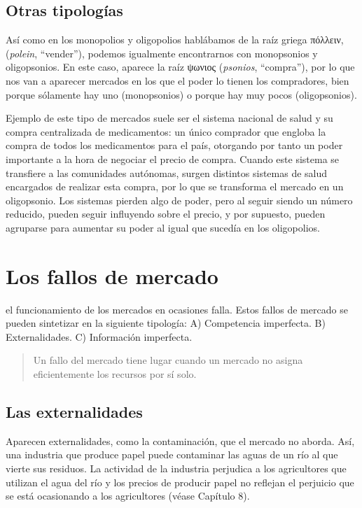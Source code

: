 \documentclass[
]{book}
\begin{document}
\hypertarget{otras-tipologuxedas}{%
\section{Otras tipologías}\label{otras-tipologuxedas}}

Así como en los monopolios y oligopolios hablábamos de la raíz griega πόλλειν, (\emph{polein}, ``vender''), podemos igualmente encontrarnos con monopsonios y oligopsonios. En este caso, aparece la raíz ψωνιος (\emph{psonios}, ``compra''), por lo que nos van a aparecer mercados en los que el poder lo tienen los compradores, bien porque sólamente hay uno (monopsonios) o porque hay muy pocos (oligopsonios).

Ejemplo de este tipo de mercados suele ser el sistema nacional de salud y su compra centralizada de medicamentos: un único comprador que engloba la compra de todos los medicamentos para el país, otorgando por tanto un poder importante a la hora de negociar el precio de compra. Cuando este sistema se transfiere a las comunidades autónomas, surgen distintos sistemas de salud encargados de realizar esta compra, por lo que se transforma el mercado en un oligopsonio. Los sistemas pierden algo de poder, pero al seguir siendo un número reducido, pueden seguir influyendo sobre el precio, y por supuesto, pueden agruparse para aumentar su poder al igual que sucedía en los oligopolios.

\hypertarget{los-fallos-de-mercado}{%
\chapter{Los fallos de mercado}\label{los-fallos-de-mercado}}

el funcionamiento de los mercados en ocasiones falla. Estos fallos de mercado se pueden sintetizar en la siguiente tipología:
A) Competencia imperfecta.
B) Externalidades.
C) Información imperfecta.

\begin{quote}
Un fallo del mercado tiene lugar cuando un mercado no asigna eficientemente los recursos por sí solo.
\end{quote}

\hypertarget{las-externalidades}{%
\section{Las externalidades}\label{las-externalidades}}

Aparecen externalidades, como la contaminación, que el mercado no aborda. Así, una industria que produce papel puede contaminar las aguas de un río al que vierte sus residuos. La actividad de la industria perjudica a los agricultores que utilizan el agua del río y los precios de producir papel no reflejan el perjuicio que se está ocasionando a los agricultores (véase Capítulo 8).
\end{document}
